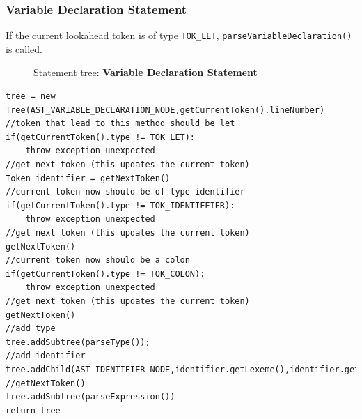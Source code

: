 \subsubsection{Variable Declaration Statement}
\label{sec:var tree statement}
If the current lookahead token is of type \verb!TOK_LET!, \verb!parseVariableDeclaration()! is called. 
\begin{figure}[H]
	\centering
	\caption{Statement tree: \textbf{Variable Declaration Statement}}
	\label{fig:variable declaration}
\end{figure}
\begin{lstlisting}[caption={PSEUDOCODE for building a variable declaration tree (\emph{parseVariableDeclaration())}},label=listing:variable declaration tree]
tree = new Tree(AST_VARIABLE_DECLARATION_NODE,getCurrentToken().lineNumber)
//token that lead to this method should be let
if(getCurrentToken().type != TOK_LET):
    throw exception unexpected
//get next token (this updates the current token)
Token identifier = getNextToken()
//current token now should be of type identifier
if(getCurrentToken().type != TOK_IDENTIFFIER):
    throw exception unexpected
//get next token (this updates the current token)
getNextToken()
//current token now should be a colon
if(getCurrentToken().type != TOK_COLON):
    throw exception unexpected
//get next token (this updates the current token)
getNextToken()
//add type 
tree.addSubtree(parseType());
//add identifier 
tree.addChild(AST_IDENTIFIER_NODE,identifier.getLexeme(),identifier.getLineNumber())
//getNextToken()
tree.addSubtree(parseExpression())
return tree
\end{lstlisting}

